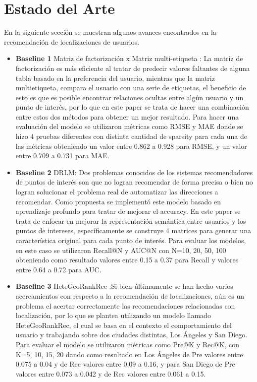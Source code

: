 \documentclass[sigplan,screen]{acmart}
\begin{document}
\section{Estado del Arte}
En la siguiente sección se muestran algunos avances encontrados en la recomendación de localizaciones de usuarios. 
\begin{itemize}
    \item \textbf{Baseline 1} Matriz de factorización x Matriz multi-etiqueta \cite{zhang2019fused}: La matriz de factorización es más eficiente al tratar de predecir valores faltantes de alguna tabla basado en la preferencia del usuario, mientras que la matriz multietiqueta, compara el usuario con una serie de etiquetas, el beneficio de esto es que es posible encontrar relaciones ocultas entre algún usuario y un punto de interés, por lo que en este paper se trata de hacer una combinación entre estos dos métodos para obtener un mejor resultado. Para hacer una evaluación del modelo se utilizaron métricas como RMSE y MAE donde se hizo 4 pruebas diferentes con distinta cantidad de sparsity para cada una de las métricas obteniendo un valor entre 0.862 a 0.928 para RMSE, y un valor entre 0.709 a 0.731 para MAE. \\

    \item \textbf{Baseline 2} DRLM\cite{huang2020deep}: Dos problemas conocidos de los sistemas recomendadores de puntos de interés son que no logran recomendar de forma precisa o bien no logran solucionar el problema real de automatizar las direcciones a recomendar. Como propuesta se implementó este modelo basado en aprendizaje profundo para tratar de mejorar el accuracy. En este paper se trata de enfocar en mejorar la representación semántica entre usuarios y los puntos de intereses, específicamente se construye 4 matrices para generar una característica original para cada punto de interés. Para evaluar los modelos, en este caso se utilizaron Recall@N y AUC@N  con N={10, 20, 50, 100} obteniendo como resultado valores entre 0.15 a 0.37 para Recall y valores entre 0.64 a 0.72 para AUC. \\

    \item \textbf{Baseline 3} HeteGeoRankRec \cite{yu2019point}:Si bien últimamente se han hecho varios acercamientos con respecto a la recomendación de localizaciones, aún es un problema el acertar correctamente las recomendaciones relacionadas con localización, por lo que se plantea utilizando un modelo llamado HeteGeoRankRec, el cual se basa en el contexto el comportamiento del usuario y trabajando sobre dos ciudades distintas, Los Ángeles y San Diego. Para evaluar el modelo se utilizaron métricas como Pre@K y Rec@K, con K={5, 10, 15, 20} dando como resultado en Los Ángeles de Pre valores entre 0.075 a 0.04 y de Rec valores entre 0.09 a 0.16, y para San Diego de Pre valores entre 0.073 a 0.042 y de Rec valores entre 0.061 a 0.15.

\end{itemize}
\end{document}
